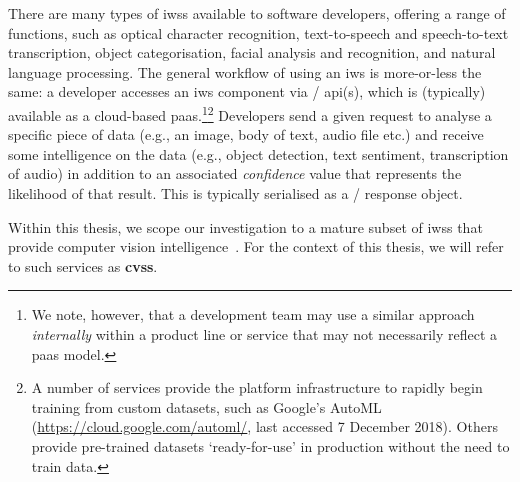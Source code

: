There are many types of \glspl{iws} available to software developers, offering a range of functions, such as optical character recognition, text-to-speech and speech-to-text transcription, object categorisation, facial analysis and recognition, and natural language processing. The general workflow of using an \gls{iws} is more-or-less the same: a developer accesses an \gls{iws} component via / \gls{api}(s), which is (typically) available as a cloud-based \gls{paas}.\footnote{We note, however, that a development team may use a similar approach \textit{internally} within a product line or service that may not necessarily reflect a \gls{paas} model.}\footnote{A number of services provide the platform infrastructure to rapidly begin training from custom datasets, such as Google's AutoML (\url{https://cloud.google.com/automl/}, last accessed 7 December 2018). Others provide pre-trained datasets `ready-for-use' in production without the need to train data.} Developers send a given request to analyse a specific piece of data (e.g., an image, body of text, audio file etc.) and receive some intelligence on the data (e.g., object detection, text sentiment, transcription of audio) in addition to an associated \textit{confidence} value that represents the likelihood of that result. This is typically serialised as a / response object. 


\begin{callout}
Within this thesis, we scope our investigation to a mature \textup{subset} of \glspl{iws} that provide computer vision intelligence~. For the context of this thesis, we will refer to such services as \textbf{\glspl{cvs}}. 
\end{callout}





